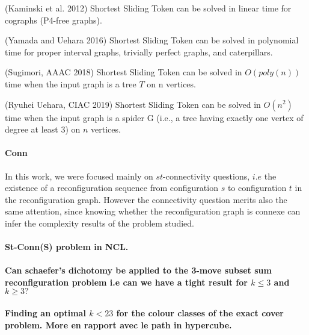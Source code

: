 \begin{theorem}(Kaminski et al. 2012)
Shortest Sliding Token can be solved in linear time for cographs (P4-free graphs).
\end{theorem}

\begin{theorem}(Yamada and Uehara 2016)
Shortest Sliding Token can be solved in polynomial time for proper interval graphs, trivially perfect graphs, and caterpillars.
\end{theorem}

\begin{theorem}(Sugimori, AAAC 2018)
Shortest Sliding Token can be solved in $O(poly(n))$ time when the input graph is a tree $T$ on n vertices.
\end{theorem}

\begin{theorem}(Ryuhei Uehara, CIAC 2019)
Shortest Sliding Token can be solved in $O(n^2)$ time when the input graph is a spider G (i.e., a tree having exactly one
vertex of degree at least $3$) on $n$ vertices.
\end{theorem}

\paragraph{Conn}
In this work, we were focused mainly on $st$-connectivity questions, $i.e$ the existence of a reconfiguration sequence from
configuration $s$ to configuration $t$ in the reconfiguration graph. However the connectivity question merits also the same
attention, since knowing whether the reconfiguration graph is connexe can infer the complexity results of the problem studied.

\paragraph{St-Conn(S) problem in NCL.}

\paragraph{Can schaefer's dichotomy be applied to the 3-move subset sum reconfiguration problem i.e can we have a tight result for $k \leq 3$ and $k \geq 3 ? $}

\paragraph{Finding an optimal $k < 23$ for the colour classes of the exact cover problem. More en rapport avec le path in hypercube.}
